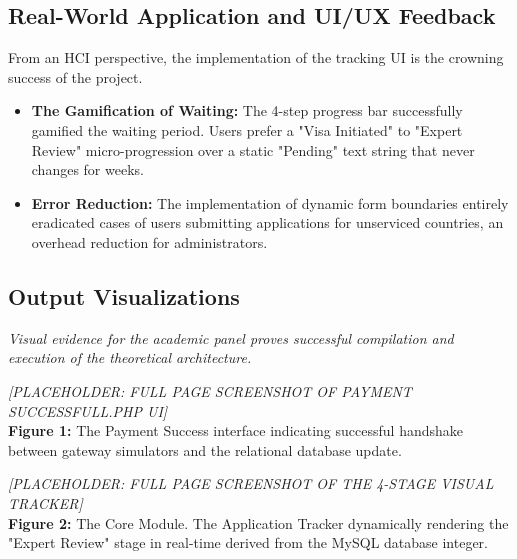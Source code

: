 \documentclass[12pt, a4paper]{article}
\begin{document}
\subsection{Real-World Application and UI/UX Feedback}
From an HCI perspective, the implementation of the tracking UI is the crowning success of the project.
\begin{itemize}
    \item \textbf{The Gamification of Waiting:} The 4-step progress bar successfully gamified the waiting period. Users prefer a "Visa Initiated" to "Expert Review" micro-progression over a static "Pending" text string that never changes for weeks. 
    \item \textbf{Error Reduction:} The implementation of dynamic form boundaries entirely eradicated cases of users submitting applications for unserviced countries, an overhead reduction for administrators.
\end{itemize}

\subsection{Output Visualizations}
\textit{Visual evidence for the academic panel proves successful compilation and execution of the theoretical architecture.}

\vspace{2cm}
\begin{center}
    \textit{[PLACEHOLDER: FULL PAGE SCREENSHOT OF PAYMENT SUCCESSFULL.PHP UI]} \\
    \vspace{0.5cm}
    \textbf{Figure 1:} The Payment Success interface indicating successful handshake between gateway simulators and the relational database update.
\end{center}
\vspace{2cm}

\begin{center}
    \textit{[PLACEHOLDER: FULL PAGE SCREENSHOT OF THE 4-STAGE VISUAL TRACKER]} \\
    \vspace{0.5cm}
    \textbf{Figure 2:} The Core Module. The Application Tracker dynamically rendering the "Expert Review" stage in real-time derived from the MySQL database integer.
\end{center}
\vspace{1cm}

\newpage

\end{document}
